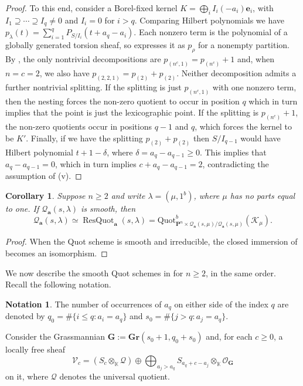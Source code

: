 \documentclass[leqno,11pt,a4paper]{amsart}
\newtheorem{cor}[cor]{Corollary}
\theoremstyle{definition}
\newtheorem{notation}[notation]{Notation}
\numberwithin{equation}{section}
\newcommand{\Gr}{\mathbf{Gr}}
\newcommand{\kk}{\mathbb{K}}
\newcommand{\bfa}{\mathbf{a}}
\newcommand{\Quot}{\mathrm{Quot}}
\newcommand{\PP}{\mathbf{P}}
\newcommand{\bfe}{\mathbf{e}}
\newcommand{\OO}{\mathscr{O}}
\newcommand{\KK}{\mathscr{K}}
\newcommand{\QQ}{\mathcal{Q}}
\DeclareMathOperator{\ResQuot}{ResQuot}
\begin{document}
\begin{proof}
To this end, consider a Borel-fixed kernel $K = \bigoplus_i I_i(-a_i)\bfe_i$, with $I_1\supseteq\cdots\supseteq I_q\ne0$ and $I_i=0$ for $i>q$.
Comparing Hilbert polynomials we have  $p_\lambda(t)=\sum_{i=1}^q P_{S/I_i}(t+a_q-a_i)$.
Each nonzero term is the polynomial of a globally generated torsion sheaf, so  expresses it as $p_\rho$ for a nonempty partition.
By \cite[Lemma~2.1]{SSS26}, the only nontrivial decompositions are $p_{(n^c,1)}=p_{(n^c)}+1$ and, when  $n=c=2$, we also have $p_{(2,2,1)}=p_{(2)}+p_{(2)}$.
Neither decomposition admits a further nontrivial splitting.
If the splitting is just $p_{(n^c,1)}$ with one nonzero term, then the nesting forces the non-zero quotient to occur in position $q$ which in turn implies that the point is just the lexicographic point. 
If the splitting is $p_{(n^c)}+1$, the non-zero quotients occur in positions $q-1$ and $q$, which forces the kernel to be $K'$. 
Finally, if we have the splitting $p_{(2)} + p_{(2)}$ then $S/I_{q-1}$ would have Hilbert polynomial $t+1-\delta$, where $\delta=a_q-a_{q-1} \geq 0$. 
This implies that $a_q - a_{q-1} = 0$, which in turn implies $c+a_q - a_{q-1} =2$, contradicting the assumption of (v).
\end{proof}

\begin{cor}\label{smooth_quot_functor}
Suppose $n\geq2$ and write $\lambda=(\mu,1^b)$, where $\mu$ has no parts equal to one. If $\QQ_{\bfa}(s,\lambda)$ is smooth, then
$$
\QQ_{\bfa}(s,\lambda) \simeq \ResQuot_{\bfa}(s,\lambda) =\Quot^b_{\PP^n\times\QQ_{\bfa}(s,\mu)/\QQ_{\bfa}(s,\mu)}(\KK_\mu).
$$
\end{cor}
\begin{proof}
When the Quot scheme is smooth and irreducible, the closed immersion of  becomes an isomorphism.
\end{proof}


We now describe the smooth Quot schemes in  for $n\geq 2$, in the same order. Recall the following notation.

\begin{notation}
The number of occurrences of $a_q$ on either side of the index $q$ are denoted by $q_0=\#\{i\leq q:a_i=a_q\}$ and $s_0=\#\{j>q:a_j=a_q\}$. 

Consider the Grassmannian $\mathbf{G} :=\Gr(s_0+1,q_0+s_0)$ and, for each $c \geq 0$, a locally free sheaf
$$
\mathscr{V}_c= (S_c\otimes_\kk \mathscr{Q}) \oplus \bigoplus_{a_j>a_q} S_{a_q+c-a_j}\otimes_\kk\OO_{\mathbf{G}}
$$
on it, where $\mathscr{Q}$ denotes the universal quotient.
\end{notation}
\end{document}
